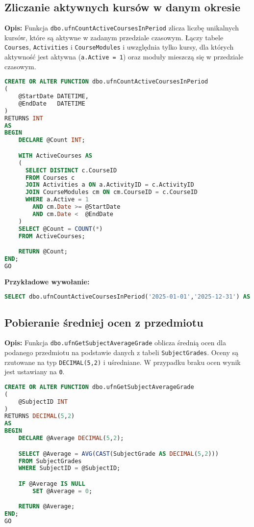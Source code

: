 \documentclass[12pt]{article}
\begin{document}
\newpage

\subsection{Zliczanie aktywnych kursów w danym okresie}
\label{sec:active_courses_period}

\textbf{Opis:} Funkcja \texttt{dbo.ufnCountActiveCoursesInPeriod} zlicza liczbę unikalnych kursów, które są aktywne w zadanym przedziale czasowym. Łączy tabele \texttt{Courses}, \texttt{Activities} i \texttt{CourseModules} i uwzględnia tylko kursy, dla których aktywność jest aktywna (\texttt{a.Active = 1}) oraz moduły mieszczą się w przedziale czasowym.

 
\begin{lstlisting}[language=SQL]
CREATE OR ALTER FUNCTION dbo.ufnCountActiveCoursesInPeriod
(
    @StartDate DATETIME,
    @EndDate   DATETIME
)
RETURNS INT
AS
BEGIN
    DECLARE @Count INT;

    WITH ActiveCourses AS
    (
      SELECT DISTINCT c.CourseID
      FROM Courses c
      JOIN Activities a ON a.ActivityID = c.ActivityID
      JOIN CourseModules cm ON cm.CourseID = c.CourseID
      WHERE a.Active = 1
        AND cm.Date >= @StartDate
        AND cm.Date <  @EndDate
    )
    SELECT @Count = COUNT(*)
    FROM ActiveCourses;

    RETURN @Count;
END;
GO
\end{lstlisting}

\textbf{Przykładowe wywołanie:}
\begin{lstlisting}[language=SQL]
SELECT dbo.ufnCountActiveCoursesInPeriod('2025-01-01','2025-12-31') AS TotalActiveCourses;
\end{lstlisting}


\newpage
\subsection{Pobieranie średniej ocen z przedmiotu}
\label{sec:subject_average_grade}

\textbf{Opis:} Funkcja \texttt{dbo.ufnGetSubjectAverageGrade} oblicza średnią ocen dla podanego przedmiotu na podstawie danych z tabeli \texttt{SubjectGrades}. Oceny są rzutowane na typ \texttt{DECIMAL(5,2)} i uśredniane. W przypadku braku ocen wynik jest ustawiany na \texttt{0}.

 
\begin{lstlisting}[language=SQL]
CREATE OR ALTER FUNCTION dbo.ufnGetSubjectAverageGrade
(
    @SubjectID INT
)
RETURNS DECIMAL(5,2)
AS
BEGIN
    DECLARE @Average DECIMAL(5,2);

    SELECT @Average = AVG(CAST(SubjectGrade AS DECIMAL(5,2)))
    FROM SubjectGrades
    WHERE SubjectID = @SubjectID;

    IF @Average IS NULL
        SET @Average = 0;

    RETURN @Average;
END;
GO
\end{lstlisting}
\end{document}
